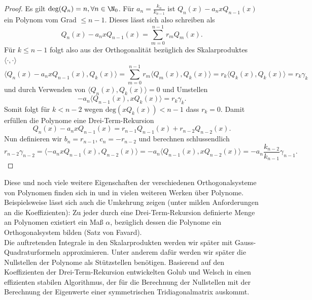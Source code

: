 \begin{proof}
Es gilt $\text{deg}(Q_n)=n,\forall n\in\N_0$. Für $a_n=\frac{k_n}{k_{n-1}}$ ist $Q_n(x)-a_nxQ_{n-1}(x)$ ein Polynom vom Grad $\le n-1$. Dieses lässt sich also schreiben als
\[Q_n(x)-a_nxQ_{n-1}(x)=\sum_{m=0}^{n-1}r_mQ_m(x).\]
Für $k\le n-1$ folgt also aus der Orthogonalität bezüglich des Skalarproduktes $\langle\cdot,\cdot\rangle$
\begin{equation*}
\langle Q_n(x)-a_nxQ_{n-1}(x),Q_k(x)\rangle=\sum_{m=0}^{n-1}r_m\langle Q_m(x),Q_k(x)\rangle=r_k\langle Q_k(x),Q_k(x)\rangle=r_k\gamma_k
\end{equation*}
und durch Verwenden von $\langle Q_n(x),Q_k(x)\rangle = 0$ und Umstellen
\[ -a_n\langle Q_{n-1}(x),xQ_k(x)\rangle=r_k\gamma_k.\]
Somit folgt für $k<n-2$ wegen $\text{deg}(xQ_k(x))<n-1$ dass $r_k=0$. Damit erfüllen die Polynome eine Drei-Term-Rekursion
\[Q_n(x)-a_nxQ_{n-1}(x)=r_{n-1}Q_{n-1}(x)+r_{n-2}Q_{n-2}(x).\]
Nun definieren wir $b_n=r_{n-1}$, $c_n=-r_{n-2}$ und berechnen schlussendlich
\[r_{n-2}\gamma_{n-2}=\langle -a_nxQ_{n-1}(x),Q_{n-2}(x)\rangle =-a_n\langle Q_{n-1}(x),xQ_{n-2}(x)\rangle=-a_n\frac{k_{n-2}}{k_{n-1}}\gamma_{n-1}.\]
\end{proof}
Diese und noch viele weitere Eigenschaften der verschiedenen Orthogonalsysteme von Polynomen finden sich in \autocite{weborthopoly} und in vielen weiteren Werken über Polynome. Beispielsweise lässt sich auch die Umkehrung zeigen (unter milden Anforderungen an die Koeffizienten): Zu jeder durch eine Drei-Term-Rekursion definierte Menge an Polynomen existiert ein Maß $\alpha$, bezüglich dessen die Polynome ein Orthogonalsystem bilden (Satz von Favard).\\[0.3cm]
Die auftretenden Integrale in den Skalarprodukten werden wir später mit Gauss-Quadraturformeln approximieren. Unter anderem dafür werden wir später die Nullstellen der Polynome als Stützstellen benötigen. Basierend auf den Koeffizienten der Drei-Term-Rekursion entwickelten Golub und Welsch in \autocite{GolubWelsch} einen effizienten stabilen Algorithmus, der für die Berechnung der Nullstellen mit der Berechnung der Eigenwerte einer symmetrischen Tridiagonalmatrix auskommt.

